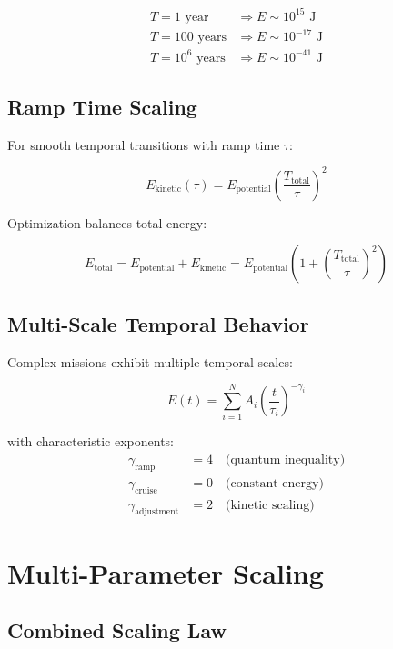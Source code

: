 \documentclass[12pt,a4paper]{article}
\begin{document}
\begin{align}
T = 1 \text{ year} &\Rightarrow E \sim 10^{15} \text{ J} \\
T = 100 \text{ years} &\Rightarrow E \sim 10^{-17} \text{ J} \\
T = 10^6 \text{ years} &\Rightarrow E \sim 10^{-41} \text{ J}
\end{align}

\subsection{Ramp Time Scaling}

For smooth temporal transitions with ramp time $\tau$:

\begin{equation}
E_{\text{kinetic}}(\tau) = E_{\text{potential}} \left(\frac{T_{\text{total}}}{\tau}\right)^2
\end{equation}

Optimization balances total energy:

\begin{equation}
E_{\text{total}} = E_{\text{potential}} + E_{\text{kinetic}} = E_{\text{potential}}\left(1 + \left(\frac{T_{\text{total}}}{\tau}\right)^2\right)
\end{equation}

\subsection{Multi-Scale Temporal Behavior}

Complex missions exhibit multiple temporal scales:

\begin{equation}
E(t) = \sum_{i=1}^N A_i \left(\frac{t}{\tau_i}\right)^{-\gamma_i}
\end{equation}

with characteristic exponents:
\begin{align}
\gamma_{\text{ramp}} &= 4 \quad \text{(quantum inequality)} \\
\gamma_{\text{cruise}} &= 0 \quad \text{(constant energy)} \\
\gamma_{\text{adjustment}} &= 2 \quad \text{(kinetic scaling)}
\end{align}

\section{Multi-Parameter Scaling}

\subsection{Combined Scaling Law}
\end{document}
